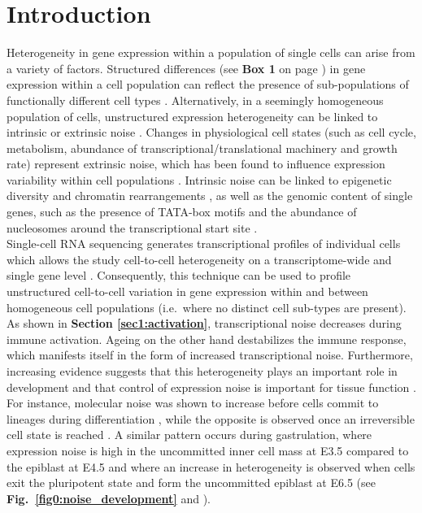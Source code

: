 
\section{Introduction}

Heterogeneity in gene expression within a population of single cells can arise from a variety of factors. Structured differences (see \textbf{Box 1} on page \pageref{box1}) in gene expression within a cell population can reflect the presence of sub-populations of functionally different cell types \citep{Zeisel2015, Paul2015}. Alternatively, in a seemingly homogeneous population of cells,  unstructured expression heterogeneity can be linked to intrinsic or extrinsic noise \citep{Elowitz2002}. Changes in physiological cell states (such as cell cycle, metabolism, abundance of transcriptional/translational machinery and growth rate) represent extrinsic noise, which has been found to influence expression variability within cell populations \citep{Keren2015, Buettner2015, Zeng2017}. Intrinsic noise can be linked to epigenetic diversity \citep{Smallwood2014} and chromatin rearrangements \citep{Buenrostro2015}, as well as the genomic content of single genes, such as the presence of TATA-box motifs and the abundance of nucleosomes around the transcriptional start site \citep{Hornung2012}.  \\ 

Single-cell RNA sequencing generates transcriptional profiles of individual cells which allows the study cell-to-cell heterogeneity on a transcriptome-wide \citep{Grun2014} and single gene level \citep{Goolam2016}. Consequently, this technique can be used to profile unstructured cell-to-cell variation in gene expression within and between homogeneous cell populations (i.e.~where no distinct cell sub-types are present). As shown in \textbf{Section \ref{sec1:activation}}, transcriptional noise decreases during immune activation. Ageing on the other hand destabilizes the immune response, which manifests itself in the form of increased transcriptional noise. Furthermore, increasing evidence suggests that this heterogeneity plays an important role in development \citep{Chang2008} and that control of expression noise is important for tissue function \citep{BaharHalpern2015}. For instance, molecular noise was shown to increase before cells commit to lineages during differentiation \citep{Mojtahedi2016}, while the opposite is observed once an irreversible cell state is reached \citep{Richard2016}. A similar pattern occurs during gastrulation, where expression noise is high in the uncommitted inner cell mass at E3.5 compared to the epiblast at E4.5 and where an increase in heterogeneity is observed when cells exit the pluripotent state and form the uncommitted epiblast at E6.5 (see \textbf{Fig.~\ref{fig0:noise_development}} and \citep{Mohammed2017}). \\

